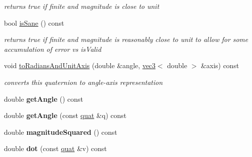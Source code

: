 \begin{DoxyCompactItemize}
\begin{DoxyCompactList}\small\item\em returns true if finite and magnitude is close to unit \item\end{DoxyCompactList}\item 
\hypertarget{classmath_1_1quat_ab749bbff5a04904e565f1c2645ea9721}{
bool \hyperlink{classmath_1_1quat_ab749bbff5a04904e565f1c2645ea9721}{isSane} () const }
\label{classmath_1_1quat_ab749bbff5a04904e565f1c2645ea9721}

\begin{DoxyCompactList}\small\item\em returns true if finite and magnitude is reasonably close to unit to allow for some accumulation of error vs isValid \item\end{DoxyCompactList}\item 
\hypertarget{classmath_1_1quat_a01c039d3a964b91799b77dd7fda830cb}{
void \hyperlink{classmath_1_1quat_a01c039d3a964b91799b77dd7fda830cb}{toRadiansAndUnitAxis} (double \&angle, \hyperlink{classmath_1_1vec3}{vec3}$<$ double $>$ \&axis) const }
\label{classmath_1_1quat_a01c039d3a964b91799b77dd7fda830cb}

\begin{DoxyCompactList}\small\item\em converts this quaternion to angle-\/axis representation \item\end{DoxyCompactList}\item 
\hypertarget{classmath_1_1quat_a7c9eda8c3ebfc84060e5bf1af7f69c02}{
double {\bfseries getAngle} () const }
\label{classmath_1_1quat_a7c9eda8c3ebfc84060e5bf1af7f69c02}

\item 
\hypertarget{classmath_1_1quat_aa6841f849682401ee401b43a1bc2abed}{
double {\bfseries getAngle} (const \hyperlink{classmath_1_1quat}{quat} \&q) const }
\label{classmath_1_1quat_aa6841f849682401ee401b43a1bc2abed}

\item 
\hypertarget{classmath_1_1quat_ab10f6a19dac573de28ef8821fb285abd}{
double {\bfseries magnitudeSquared} () const }
\label{classmath_1_1quat_ab10f6a19dac573de28ef8821fb285abd}

\item 
\hypertarget{classmath_1_1quat_a54a9efdbff72391b267f040a1f363770}{
double {\bfseries dot} (const \hyperlink{classmath_1_1quat}{quat} \&v) const }
\label{classmath_1_1quat_a54a9efdbff72391b267f040a1f363770}


\end{DoxyCompactItemize}
